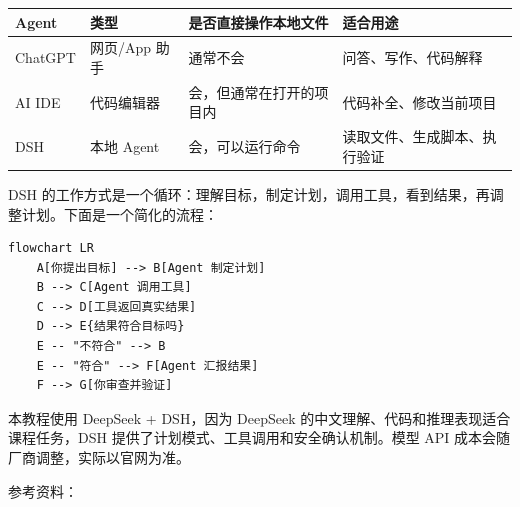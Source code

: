 \begin{longtable}[]{@{}
  >{\raggedright\arraybackslash}p{}
  >{\raggedright\arraybackslash}p{}
  >{\raggedright\arraybackslash}p{}
  >{\raggedright\arraybackslash}p{}@{}}
\toprule\noalign{}
\begin{minipage}[b]{\linewidth}\raggedright
Agent
\end{minipage} & \begin{minipage}[b]{\linewidth}\raggedright
类型
\end{minipage} & \begin{minipage}[b]{\linewidth}\raggedright
是否直接操作本地文件
\end{minipage} & \begin{minipage}[b]{\linewidth}\raggedright
适合用途
\end{minipage} \\
\midrule\noalign{}
\endhead
\bottomrule\noalign{}
\endlastfoot
ChatGPT & 网页/App 助手 & 通常不会 & 问答、写作、代码解释 \\
AI IDE & 代码编辑器 & 会，但通常在打开的项目内 &
代码补全、修改当前项目 \\
DSH & 本地 Agent & 会，可以运行命令 & 读取文件、生成脚本、执行验证 \\
\end{longtable}

DSH
的工作方式是一个循环：理解目标，制定计划，调用工具，看到结果，再调整计划。下面是一个简化的流程：

\begin{lstlisting}
flowchart LR
    A[你提出目标] --> B[Agent 制定计划]
    B --> C[Agent 调用工具]
    C --> D[工具返回真实结果]
    D --> E{结果符合目标吗}
    E -- "不符合" --> B
    E -- "符合" --> F[Agent 汇报结果]
    F --> G[你审查并验证]
\end{lstlisting}

本教程使用 DeepSeek + DSH，因为 DeepSeek
的中文理解、代码和推理表现适合课程任务，DSH
提供了计划模式、工具调用和安全确认机制。模型 API
成本会随厂商调整，实际以官网为准。

参考资料：

